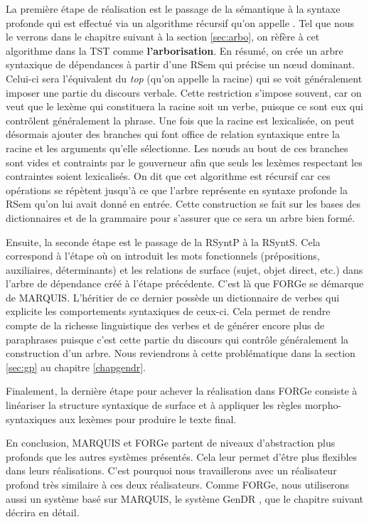 La première étape de réalisation est le passage de la sémantique à la syntaxe profonde qui est effectué via un algorithme récursif qu'on appelle . Tel que nous le verrons dans le chapitre suivant à la section \ref{sec:arbo}, on rèfère à cet algorithme dans la \ac{TST} comme \textbf{l'arborisation}. En résumé, on crée un arbre syntaxique de dépendances à partir d'une \ac{RSem} qui précise un n\oe{}ud dominant. Celui-ci sera l'équivalent du \emph{top} (qu'on appelle la racine) qui se voit généralement imposer une partie du discours verbale. Cette restriction s'impose souvent, car on veut que le lexème qui constituera la racine soit un verbe, puisque ce sont eux qui contrôlent généralement la phrase. Une fois que la racine est lexicalisée, on peut désormais ajouter des branches qui font office de relation syntaxique entre la racine et les arguments qu'elle sélectionne. Les n\oe{}uds au bout de ces branches sont vides et contraints par le gouverneur afin que seuls les lexèmes respectant les contraintes soient lexicalisés. On dit que cet algorithme est récursif car ces opérations se répètent jusqu'à ce que l'arbre représente en syntaxe profonde la \ac{RSem} qu'on lui avait donné en entrée. Cette construction se fait sur les bases des dictionnaires et de la grammaire pour s'assurer que ce sera un arbre bien formé.

Ensuite, la seconde étape est le passage de la \ac{RSyntP} à la \ac{RSyntS}. Cela correspond à l'étape où on introduit les mots fonctionnels (prépositions, auxiliaires, déterminants) et les relations de surface (sujet, objet direct, etc.) dans l'arbre de dépendance créé à l'étape précédente. C'est là que FORGe se démarque de MARQUIS. L'héritier de ce dernier possède un dictionnaire de verbes qui explicite les comportements syntaxiques de ceux-ci. Cela permet de rendre compte de la richesse linguistique des verbes et de générer encore plus de paraphrases puisque c'est cette partie du discours qui contrôle généralement la construction d'un arbre. Nous reviendrons à cette problématique dans la section \ref{sec:gp} au chapitre \ref{chapgendr}.
                                                                                                                     
Finalement, la dernière étape pour achever la réalisation dans FORGe consiste à linéariser la structure syntaxique de surface et à appliquer les règles morpho-syntaxiques aux lexèmes pour produire le texte final.

En conclusion, MARQUIS et FORGe partent de niveaux d'abstraction plus profonds que les autres systèmes présentés. Cela leur permet d'être plus flexibles dans leurs réalisations. C'est pourquoi nous travaillerons avec un réalisateur profond très similaire à ces deux réalisateurs. Comme FORGe, nous utiliserons aussi un système basé sur MARQUIS, le système GenDR \citep{lambrey15,LambreyImplementationcollocationspour2017,lareau18}, que le chapitre suivant décrira en détail.
